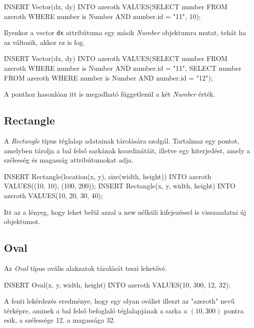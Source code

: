 \begin{sql}
INSERT Vector(dx, dy) INTO azeroth VALUES(SELECT number FROM
azeroth WHERE number is Number AND number.id = "11", 10);
\end{sql}

Ilyenkor a vector \texttt{dx} attribútuma egy másik \textit{Number} objektumra mutat, tehát ha az változik, akkor ez is fog.

\begin{sql}
INSERT Vector(dx, dy) INTO azeroth VALUES(SELECT number
FROM azeroth WHERE number is Number AND number.id = "11",
    SELECT number FROM azeroth
    WHERE number is Number AND number.id = "12");
\end{sql}

A ponthoz hasonlóan itt is megadható függetlenül a két \textit{Number} érték.


\subsection{Rectangle}

A \textit{Rectangle} típus téglalap adatainak tárolására szolgál. Tartalmaz egy pontot, amelyben tárolja a bal felső sarkának koordinátáit, illetve egy kiterjedést, amely a szélesség és magasság attribútumokat adja.

\begin{sql}
INSERT Rectangle(location(x, y), size(width, height)) INTO azeroth 
VALUES((10, 10), (100, 200)); 
INSERT Rectangle(x, y, width, height) INTO
azeroth VALUES(10, 20, 30, 40);
\end{sql}

Itt az a lényeg, hogy lehet belül azzal a new nélküli kifejezéssel is visszaadatni új objektumot.

\subsection{Oval}

Az \textit{Oval} típus ovális alakzatok tárolását teszi lehetővé. 

\begin{sql}
INSERT Oval(x, y, width, height) INTO azeroth 
VALUES(10, 300, 12, 32);
\end{sql}

A fenti lekérdezés eredménye, hogy egy olyan oválist illeszt az "azeroth" nevű térképre, aminek a bal felső befoglaló téglalapjának a sarka a $(10, 300)$ pontra esik, a szélessége 12, a magassága 32. 

